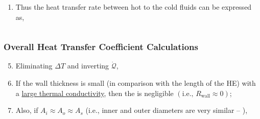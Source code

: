 \documentclass[10pt,compress,unknownkeysallowed]{beamer}
\begin{document}
\begin{frame}
\begin{columns}
\begin{column}[l]{0.5\linewidth}
\begin{enumerate}
            \item<4-> Thus the heat transfer rate between hot to the cold fluids can be expressed as,

         \end{enumerate}
       \end{column}      
    \end{columns}
\end{frame}


\begin{frame}
  \frametitle{Overall Heat Transfer Coefficient Calculations}
     \begin{enumerate}\setcounter{enumi}{4}%
        \item<1-> Eliminating $\Delta T$ and inverting $\dot{\mathcal{Q}}$,
        \item<2-> If the wall thickness is small (in comparison with the length of the HE) with a \underline{large thermal conductivity}, then the  is negligible $\left(\text{i.e., }R_{\text{wall}} \approx 0\right)$;
        \item<3-> Also, if $A_{i}\approx A_{o} \approx A_{s}$ (i.e., inner and outer diameters are very similar -- ),
     \end{enumerate}

\end{frame}
\end{document}
